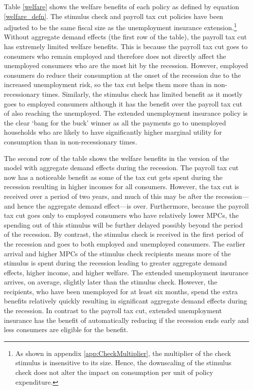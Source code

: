 \documentclass[../HAFiscal]{subfiles}
\begin{document}
Table \ref{welfare} shows the welfare benefits of each policy as defined by equation \eqref{welfare_defn}. The stimulus check and payroll tax cut policies have been adjusted to be the same fiscal size as the unemployment insurance extension.\footnote{As shown in appendix \ref{app:CheckMultiplier}, the multiplier of the check stimulus is insensitive to its size. Hence, the downscaling of the stimulus check does not alter the impact on consumption per unit of policy expenditure.} Without aggregate demand effects (the first row of the table), the payroll tax cut has extremely limited welfare benefits. This is because the payroll tax cut goes to consumers who remain employed and therefore does not directly affect the unemployed consumers who are the most hit by the recession. However, employed consumers do reduce their consumption at the onset of the recession due to the increased unemployment risk, so the tax cut helps them more than in non-recessionary times.  Similarly, the stimulus check has limited benefit as it mostly goes to employed consumers although it has the benefit over the payroll tax cut of also reaching the unemployed. The extended unemployment insurance policy is the clear `bang for the buck' winner as all the payments go to unemployed households who are likely to have significantly higher marginal utility for consumption than in non-recessionary times.

The second row of the table shows the welfare benefits in the version of the model with aggregate demand effects during the recession. The payroll tax cut now has a noticeable benefit as some of the tax cut gets spent during the recession resulting in higher incomes for all consumers. However, the tax cut is received over a period of two years, and much of this may be after the recession---and hence the aggregate demand effect---is over. Furthermore, because the payroll tax cut goes only to employed consumers who have relatively lower MPCs, the spending out of this stimulus will be further delayed possibly beyond the period of the recession. By contrast, the stimulus check is received in the first period of the recession and goes to both employed and unemployed consumers. The earlier arrival and higher MPCs of the stimulus check recipients means more of the stimulus is spent during the recession leading to greater aggregate demand effects, higher income, and higher welfare. The extended unemployment insurance arrives, on average, slightly later than the stimulus check. However, the recipients, who have been unemployed for at least six months, spend the extra benefits relatively quickly resulting in significant aggregate demand effects during the recession. In contrast to the payroll tax cut, extended unemployment insurance has the benefit of automatically reducing if the recession ends early and less consumers are eligible for the benefit.
\end{document}
